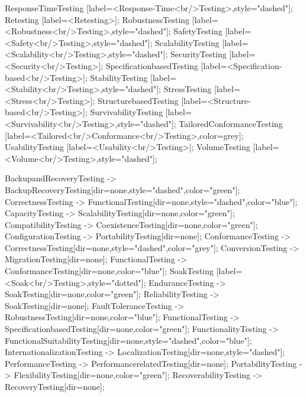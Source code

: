 \documentclass{article}
\begin{document}
{ResponseTimeTesting [label=<Response-Time<br/>Testing>,style="dashed"];
Retesting [label=<Retesting>];
RobustnessTesting [label=<Robustness<br/>Testing>,style="dashed"];
SafetyTesting [label=<Safety<br/>Testing>,style="dashed"];
ScalabilityTesting [label=<Scalability<br/>Testing>,style="dashed"];
SecurityTesting [label=<Security<br/>Testing>];
SpecificationbasedTesting [label=<Specification-based<br/>Testing>];
StabilityTesting [label=<Stability<br/>Testing>,style="dashed"];
StressTesting [label=<Stress<br/>Testing>];
StructurebasedTesting [label=<Structure-based<br/>Testing>];
SurvivabilityTesting [label=<Survivability<br/>Testing>,style="dashed"];
TailoredConformanceTesting [label=<Tailored<br/>Conformance<br/>Testing>,color=grey];
UsabilityTesting [label=<Usability<br/>Testing>];
VolumeTesting [label=<Volume<br/>Testing>,style="dashed"];

BackupandRecoveryTesting -> BackupRecoveryTesting[dir=none,style="dashed",color="green"];
CorrectnessTesting -> FunctionalTesting[dir=none,style="dashed",color="blue"];
CapacityTesting -> ScalabilityTesting[dir=none,color="green"];
CompatibilityTesting -> CoexistenceTesting[dir=none,color="green"];
ConfigurationTesting -> PortabilityTesting[dir=none];
ConformanceTesting -> CorrectnessTesting[dir=none,style="dashed",color="grey"];
ConversionTesting -> MigrationTesting[dir=none];
FunctionalTesting -> ConformanceTesting[dir=none,color="blue"];
SoakTesting [label=<Soak<br/>Testing>,style="dotted"];
EnduranceTesting -> SoakTesting[dir=none,color="green"];
ReliabilityTesting -> SoakTesting[dir=none];
FaultToleranceTesting -> RobustnessTesting[dir=none,color="blue"];
FunctionalTesting -> SpecificationbasedTesting[dir=none,color="green"];
FunctionalityTesting -> FunctionalSuitabilityTesting[dir=none,style="dashed",color="blue"];
InternationalizationTesting -> LocalizationTesting[dir=none,style="dashed"];
PerformanceTesting -> PerformancerelatedTesting[dir=none];
PortabilityTesting -> FlexibilityTesting[dir=none,color="green"];
RecoverabilityTesting -> RecoveryTesting[dir=none];

}
\end{document}
